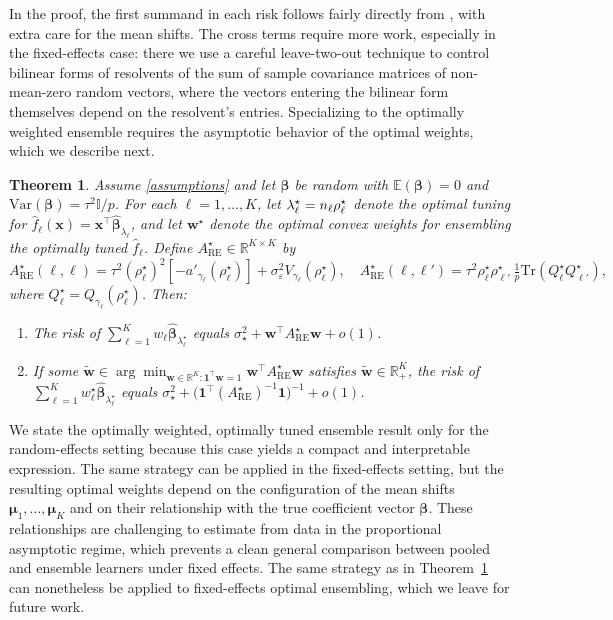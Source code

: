 \documentclass{article}
\theoremstyle{plain}
\newtheorem{theorem}{Theorem}[section]
\theoremstyle{remark}
\def \bbeta{\boldsymbol{\beta}}
\def \bx{\mathbf{x}}
\def \bbeta{\boldsymbol{\beta}}
\def \tr {\mathrm{Tr}}
\def \I{\mathcal{I}}
\def \E{\mathbb{E}}
\def \bmu{\pmb{\mu}}
\def \I {\mathbb{I}}
\begin{document}
In the proof, the first summand in each risk follows fairly directly from \cite{hastie2019surprises}, with extra care for the mean shifts. The cross terms require more work, especially in the fixed-effects case: there we use a careful leave-two-out technique to control bilinear forms of resolvents of the sum of sample covariance matrices of non-mean-zero random vectors, where the vectors entering the bilinear form themselves depend on the resolvent's entries. Specializing to the optimally weighted ensemble requires the asymptotic behavior of the optimal weights, which we describe next.

\begin{theorem}\label{thm:ensemble_optimal}
Assume \ref{assumptions} and let $\bbeta$ be random with $\E(\bbeta)=0$ and $\mathrm{Var}(\bbeta)=\tau^2\I/p$. For each $\ell=1,\ldots,K$, let $\lambda_\ell^\star=\textcolor{black}{n_\ell}\rho_\ell^\star$ denote the optimal tuning for $\hat{f}_\ell(\bx)=\bx^\top\hat{\bbeta}_{\lambda_\ell}$, and let $\mathbf{w}^\star$ denote the optimal convex weights for ensembling the optimally tuned $\hat{f}_\ell$. Define $A^\star_{\mathrm{RE}}\in\mathbb{R}^{K\times K}$ by
\[
A^\star_{\mathrm{RE}}(\ell,\ell)
=\tau^2(\rho_\ell^\star)^2[-a'_{\gamma_\ell}(\rho_\ell^\star)]
+\sigma_\varepsilon^2 V_{\gamma_\ell}(\rho_\ell^\star),
\quad
A^\star_{\mathrm{RE}}(\ell,\ell')
=\tau^2\rho_\ell^\star\rho_{\ell'}^\star\,
 \tfrac{1}{p}\tr(Q_\ell^\star Q_{\ell'}^\star),
\]
where $Q_\ell^\star=Q_{\gamma_\ell}(\rho_\ell^\star)$. Then:
\begin{enumerate}
\item The risk of $\sum_{\ell=1}^K w_\ell\hat{\bbeta}_{\lambda_\ell^\star}$ equals $\sigma_\star^2+\mathbf{w}^\top A^\star_{\mathrm{RE}}\mathbf{w}+o(1)$.

\item If some $\widetilde{\mathbf{w}}\in\arg\min_{\mathbf{w}\in\mathbb{R}^K: \mathbf{1}^\top\mathbf{w}=1}\mathbf{w}^\top A^\star_{\mathrm{RE}}\mathbf{w}$ satisfies $\widetilde{\mathbf{w}}\in\mathbb{R}_+^K$, the risk of $\sum_{\ell=1}^K w_\ell^\star\hat{\bbeta}_{\lambda_\ell^\star}$ equals $\sigma_\star^2+\bigl(\mathbf{1}^\top(A^\star_{\mathrm{RE}})^{-1}\mathbf{1}\bigr)^{-1}+o(1)$.
\end{enumerate}
\end{theorem}

We state the optimally weighted, optimally tuned ensemble result only for the random-effects setting because this case yields a compact and interpretable expression. The same strategy can be applied in the fixed-effects setting, but the resulting optimal weights depend on the configuration of the mean shifts $\bmu_1,\ldots,\bmu_K$ and on their relationship with the true coefficient vector $\bbeta$. These relationships are challenging to estimate from data in the proportional asymptotic regime, which prevents a clean general comparison between pooled and ensemble learners under fixed effects. The same strategy as in Theorem~\ref{thm:ensemble_optimal} can nonetheless be applied to fixed-effects optimal ensembling, which we leave for future work.
\end{document}
